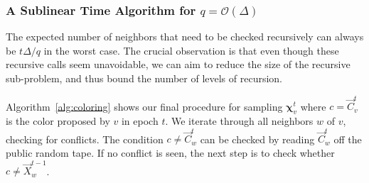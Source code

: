 \subsubsection{A Sublinear Time Algorithm for $q = \mathcal O(\Delta)$}
\label{sec:jumping_back_to_past_epochs}
The expected number of neighbors that need to be checked recursively can always be $t\Delta/q$ in the worst case.
The crucial observation is that even though these recursive calls seem unavoidable,
we can aim to reduce the size of the recursive sub-problem, and thus bound the number of levels of recursion.

Algorithm~\ref{alg:coloring} shows our final procedure for sampling $\bm\chi^t_v$ where $c =\vec C^t_v$ is the color proposed by $v$ in epoch $t$.
We iterate through all neighbors $w$ of $v$, checking for conflicts.
The condition $c\not=\vec C^t_w$ can be checked by reading $\vec C^t_w$ off the public random tape.
If no conflict is seen, the next step is to check whether $c\not= \vec X^{t-1}_w$.

